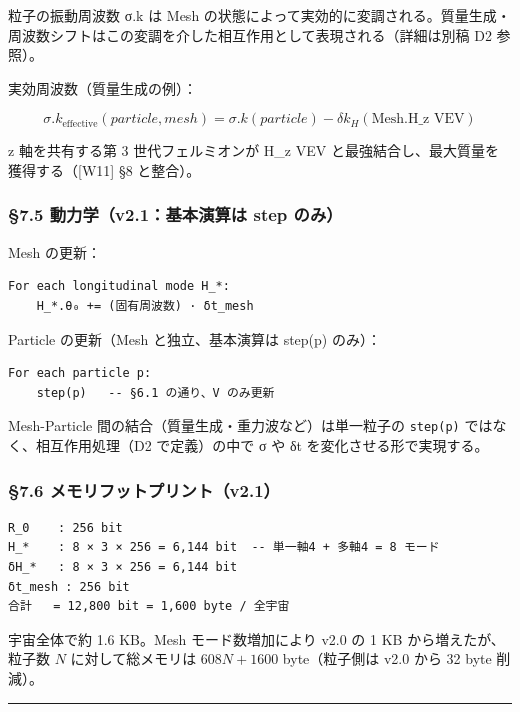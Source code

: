\documentclass[a4paper,11pt]{ltjsarticle}
\begin{document}
粒子の振動周波数 σ.k は Mesh
の状態によって実効的に変調される。質量生成・周波数シフトはこの変調を介した相互作用として表現される（詳細は別稿
D2 参照）。

実効周波数（質量生成の例）：

\[\sigma.k_{\text{effective}}(particle, mesh) = \sigma.k(particle) - \delta k_H(\text{Mesh.H\_z VEV})\]

z 軸を共有する第 3 世代フェルミオンが H\_z VEV
と最強結合し、最大質量を獲得する（{[}W11{]} §8 と整合）。

\subsubsection{§7.5 動力学（v2.1：基本演算は step
のみ）}\label{ux52d5ux529bux5b66v2.1ux57faux672cux6f14ux7b97ux306f-step-ux306eux307f}

Mesh の更新：

\begin{verbatim}
For each longitudinal mode H_*:
    H_*.θ₀ += (固有周波数) · δt_mesh
\end{verbatim}

Particle の更新（Mesh と独立、基本演算は step(p) のみ）：

\begin{verbatim}
For each particle p:
    step(p)   -- §6.1 の通り、V のみ更新
\end{verbatim}

Mesh-Particle 間の結合（質量生成・重力波など）は単一粒子の
\texttt{step(p)} ではなく、相互作用処理（D2 で定義）の中で σ や δt
を変化させる形で実現する。

\subsubsection{§7.6
メモリフットプリント（v2.1）}\label{ux30e1ux30e2ux30eaux30d5ux30c3ux30c8ux30d7ux30eaux30f3ux30c8v2.1-1}

\begin{verbatim}
R_0    : 256 bit
H_*    : 8 × 3 × 256 = 6,144 bit  -- 単一軸4 + 多軸4 = 8 モード
δH_*   : 8 × 3 × 256 = 6,144 bit
δt_mesh : 256 bit
合計   = 12,800 bit = 1,600 byte / 全宇宙
\end{verbatim}

宇宙全体で約 1.6 KB。Mesh モード数増加により v2.0 の 1 KB
から増えたが、粒子数 \(N\) に対して総メモリは \(608N + 1600\)
byte（粒子側は v2.0 から 32 byte 削減）。

\begin{center}\rule{0.5\linewidth}{0.5pt}\end{center}
\end{document}

